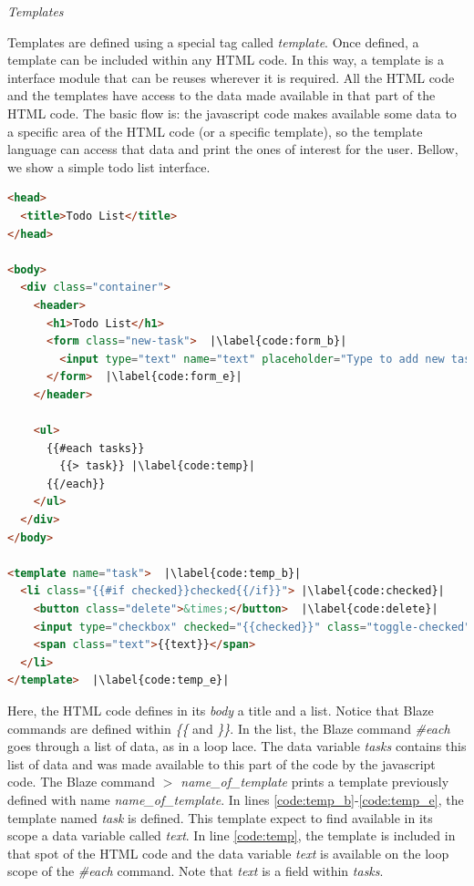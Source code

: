 \emph{Templates}

Templates are defined using a special tag called \emph{template}.
Once defined, a template can be included within any HTML code.
In this way, a template is a interface module that can be reuses wherever it is required.
All the HTML code and the templates have access to the data made available in that part of the HTML code.
The basic flow is: the javascript code makes available some data to a specific area of the HTML code (or a specific template), so the template language can access that data and print the ones of interest for the user.
Bellow, we show a simple todo list interface.

\begin{lstlisting}[language=html,escapechar=|]
<head>
  <title>Todo List</title>
</head>
 
<body>
  <div class="container">
    <header>
      <h1>Todo List</h1>
      <form class="new-task">  |\label{code:form_b}|
        <input type="text" name="text" placeholder="Type to add new tasks" />
      </form>  |\label{code:form_e}|
    </header>
 
    <ul>
      {{#each tasks}}
        {{> task}} |\label{code:temp}|
      {{/each}}
    </ul>
  </div>
</body>
 
<template name="task">  |\label{code:temp_b}|
  <li class="{{#if checked}}checked{{/if}}"> |\label{code:checked}|
    <button class="delete">&times;</button>  |\label{code:delete}|
    <input type="checkbox" checked="{{checked}}" class="toggle-checked" />
    <span class="text">{{text}}</span>
  </li>
</template>  |\label{code:temp_e}|
\end{lstlisting}

Here, the HTML code defines in its \emph{body} a title and a list.
Notice that Blaze commands are defined within \emph{\{\{} and \emph{\}\}}.
In the list, the Blaze command \emph{\#each} goes through a list of data, as in a loop lace.
The data variable \emph{tasks} contains this list of data and was made available to this part of the code by the javascript code.
The Blaze command \emph{$>$ name\_of\_template} prints a template previously defined with name \emph{name\_of\_template}.
In lines \ref{code:temp_b}-\ref{code:temp_e}, the template named \emph{task} is defined.
This template expect to find available in its scope a data variable called \emph{text}.
In line \ref{code:temp}, the template is included in that spot of the HTML code and the data variable \emph{text} is available on the loop scope of the \emph{\#each} command.
Note that \emph{text} is a field within \emph{tasks}.


